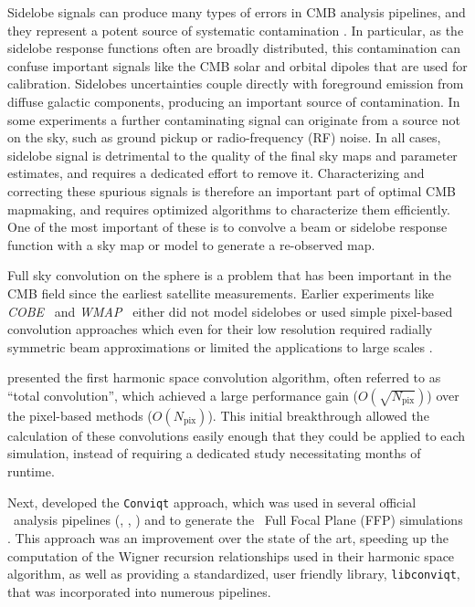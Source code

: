 \documentclass[twocolumn]{aa}
\def\WMAP{\textit{WMAP}}
\def\COBE{\textit{COBE}}
\begin{document}
Sidelobe signals can produce many types of errors in CMB analysis pipelines, and they represent a potent source of systematic contamination \citep[e.g.,][]{planck2014-a04,bp17}. In particular, as the sidelobe response functions often are broadly distributed, this contamination can confuse important signals like the CMB solar and orbital dipoles that are used for calibration. Sidelobes uncertainties couple directly with foreground emission from diffuse galactic components, producing an important source of contamination. In some experiments a further contaminating signal can originate from a source not on the sky, such as ground pickup or radio-frequency (RF) noise. In all cases, sidelobe signal is detrimental to the quality of the final sky maps and parameter estimates, and requires a dedicated effort to remove it. Characterizing and correcting these spurious signals is therefore an important part of optimal CMB mapmaking, and requires optimized algorithms to characterize them efficiently. One of the most important of these is to convolve a beam or sidelobe response function with a sky map or model to generate a re-observed map. 

Full sky convolution on the sphere is a problem that has been important in the CMB field since the earliest satellite measurements. Earlier experiments like \COBE\ \citep{cobe_sl} and \WMAP\ \citep{barnes2003} either did not model sidelobes or used simple pixel-based convolution approaches which even for their low resolution required radially symmetric beam approximations \citep{radialapprox} or limited the applications to large scales \citep{burigana2001}.

\citet{Wandelt:2001} presented the first harmonic space convolution algorithm, often referred to as ``total convolution'', which achieved a large performance gain ($O\left(\sqrt{N_\mathrm{pix}}\right)$) over the pixel-based methods ($O\left(N_\mathrm{pix}\right)$). This initial breakthrough allowed the calculation of these convolutions easily enough that they could be applied to each simulation, instead of requiring a dedicated study necessitating months of runtime. 


Next, \citet{conviqt} developed the \texttt{Conviqt} approach, which was used in several official \Planck\ analysis pipelines (\citealt{planck2014-a04}, \citealt{planck2014-a10}, \citealt{npipe}) and to generate the \Planck\ Full Focal Plane (FFP) simulations \citep{planck2014-a14}. This approach was an improvement over the state of the art, speeding up the computation of the Wigner recursion relationships used in their harmonic space algorithm, as well as providing a standardized, user friendly library, \texttt{libconviqt}, that was incorporated into numerous pipelines. 
\end{document}
